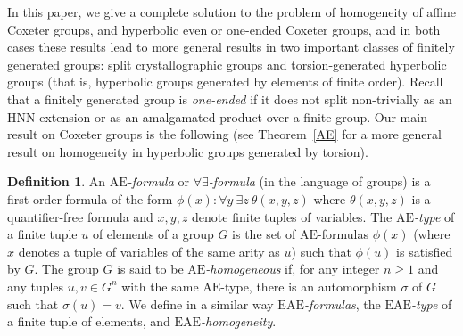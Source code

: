 \documentclass[a4paper, 11pt]{amsart}
\theoremstyle{definition}
\newtheorem{de}[te]{Definition}
\theoremstyle{remark}
\renewcommand{\geq}{\geqslant}
\begin{document}

\smallskip


In this paper, we give a complete solution to the problem of homogeneity of affine Coxeter groups, and hyperbolic even or one-ended Coxeter groups, and in both cases these results lead to more general results in two important classes of finitely generated groups: split crystallographic groups and torsion-generated hyperbolic groups (that is, hyperbolic groups generated by elements of finite order). Recall that a finitely generated group is \emph{one-ended} if it does not split non-trivially as an HNN extension or as an amalgamated product over a finite group. Our main result on Coxeter groups is the following (see Theorem~\ref{AE} for a more general result on homogeneity in hyperbolic groups generated by torsion).

\begin{de}\label{AEdef}
An \emph{$\mathrm{AE}$-formula} or \emph{$\forall\exists$-formula} (in the language of groups) is a first-order formula of the form $\phi(x):\forall y  \ \exists z \ \theta(x,y,z)$ where $\theta(x,y,z)$ is a quantifier-free formula and $x,y,z$ denote finite tuples of variables. The \emph{$\mathrm{AE}$-type} of a finite tuple $u$ of elements of a group $G$ is the set of $\mathrm{AE}$-formulas $\phi(x)$ (where $x$ denotes a tuple of variables of the same arity as $u$) such that $\phi(u)$ is satisfied by $G$. The group $G$ is said to be \emph{$\mathrm{AE}$-homogeneous} if, for any integer $n\geq 1$ and any tuples $u,v\in G^n$ with the same $\mathrm{AE}$-type, there is an automorphism $\sigma$ of $G$ such that $\sigma(u)=v$. We define in a similar way \emph{$\mathrm{EAE}$-formulas}, the \emph{$\mathrm{EAE}$-type} of a finite tuple of elements, and \emph{$\mathrm{EAE}$-homogeneity}.
\end{de}
\end{document}
